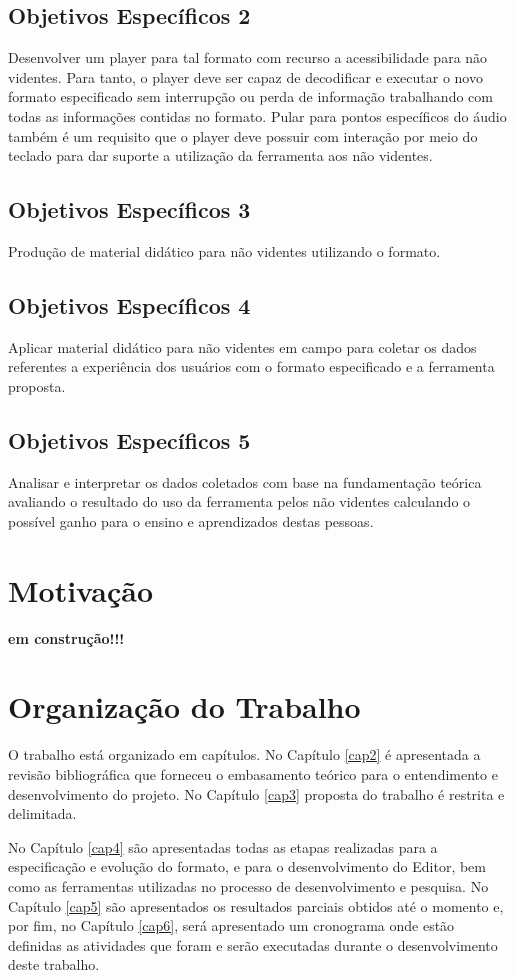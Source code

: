 \subsection{Objetivos Específicos 2}

Desenvolver um player para tal formato com recurso a acessibilidade para não videntes. Para tanto, o player deve ser capaz de decodificar e executar o novo formato especificado sem interrupção ou perda de informação trabalhando com todas as informações contidas no formato. Pular para pontos específicos do áudio também é um requisito que o player deve possuir  com interação por meio do teclado para dar suporte a utilização da ferramenta aos não videntes.

\subsection{Objetivos Específicos 3}

Produção de material didático para não videntes utilizando o formato.

\subsection{Objetivos Específicos 4}

Aplicar material didático para não videntes em campo para coletar os dados referentes a experiência dos usuários com o formato especificado e a ferramenta proposta.

\subsection{Objetivos Específicos 5}

Analisar e interpretar os dados coletados com base na fundamentação teórica avaliando o resultado do uso da ferramenta pelos não videntes calculando o possível ganho para o ensino e aprendizados destas pessoas.

\section{Motivação}

\textbf{em construção!!!}

\section{Organização do Trabalho}

O trabalho está organizado em capítulos. No Capítulo \ref{cap2} é apresentada a revisão bibliográfica que forneceu o embasamento teórico para o entendimento e desenvolvimento do projeto. No Capítulo \ref{cap3} proposta do trabalho é restrita e delimitada.

No Capítulo \ref{cap4} são apresentadas todas as etapas realizadas para a especificação e evolução do formato, e para o desenvolvimento do Editor, bem como as ferramentas utilizadas no processo de desenvolvimento e pesquisa.  No Capítulo \ref{cap5} são apresentados os resultados parciais obtidos até o momento e, por fim, no Capítulo \ref{cap6}, será apresentado um cronograma onde estão definidas as atividades que foram e serão executadas durante o desenvolvimento deste trabalho.